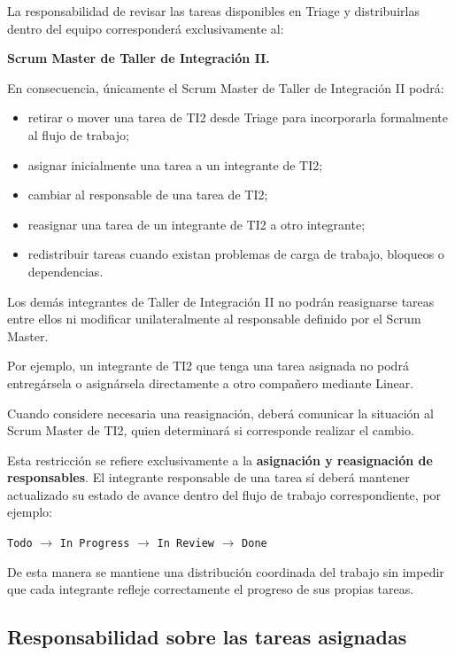 \documentclass[12pt,a4paper]{article}
\begin{document}
La responsabilidad de revisar las tareas disponibles en Triage y distribuirlas dentro del equipo corresponderá exclusivamente al:

\begin{center}
    \textbf{Scrum Master de Taller de Integración II.}
\end{center}

En consecuencia, únicamente el Scrum Master de Taller de Integración II podrá:

\begin{itemize}
    \item retirar o mover una tarea de TI2 desde Triage para incorporarla formalmente al flujo de trabajo;
    \item asignar inicialmente una tarea a un integrante de TI2;
    \item cambiar al responsable de una tarea de TI2;
    \item reasignar una tarea de un integrante de TI2 a otro integrante;
    \item redistribuir tareas cuando existan problemas de carga de trabajo, bloqueos o dependencias.
\end{itemize}

Los demás integrantes de Taller de Integración II no podrán reasignarse tareas entre ellos ni modificar unilateralmente al responsable definido por el Scrum Master.

Por ejemplo, un integrante de TI2 que tenga una tarea asignada no podrá entregársela o asignársela directamente a otro compañero mediante Linear.

Cuando considere necesaria una reasignación, deberá comunicar la situación al Scrum Master de TI2, quien determinará si corresponde realizar el cambio.

Esta restricción se refiere exclusivamente a la \textbf{asignación y reasignación de responsables}. El integrante responsable de una tarea sí deberá mantener actualizado su estado de avance dentro del flujo de trabajo correspondiente, por ejemplo:

\begin{center}
\texttt{Todo} $\rightarrow$ \texttt{In Progress} $\rightarrow$ \texttt{In Review} $\rightarrow$ \texttt{Done}
\end{center}

De esta manera se mantiene una distribución coordinada del trabajo sin impedir que cada integrante refleje correctamente el progreso de sus propias tareas.

\subsection{Responsabilidad sobre las tareas asignadas}
\end{document}

